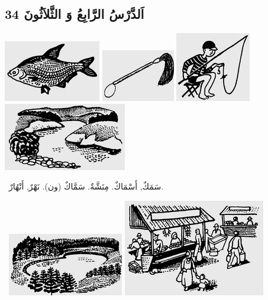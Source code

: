 \documentclass[a5paper]{article}
\begin{document}
\subsection[اَلدَّرْسُ الرَّابِعُ وَ الثَّلاَثُونَ 34]{اَلدَّرْسُ الرَّابِعُ وَ الثَّلاَثُونَ 34}
 \includegraphics[width=1.6665in,height=1.052in]{images/MuhammadBagauddinprettified-img076.png}   \includegraphics[width=1.2602in,height=0.8957in]{images/MuhammadBagauddinprettified-img077.png}   \includegraphics[width=1.2917in,height=1.198in]{images/MuhammadBagauddinprettified-img078.png}   \includegraphics[width=2.1146in,height=1.1665in]{images/MuhammadBagauddinprettified-img079.png} 

\ سَمَكٌ, أَسْمَاكٌ. مِنَشَّةٌ. سَمَّاكٌ (ون). نَهْرٌ, أَنْهُارٌ. 

\  \includegraphics[width=1.9898in,height=1.0835in]{images/MuhammadBagauddinprettified-img080.png}   \includegraphics[width=2.4374in,height=1.6665in]{images/MuhammadBagauddinprettified-img081.png} 
\end{document}
